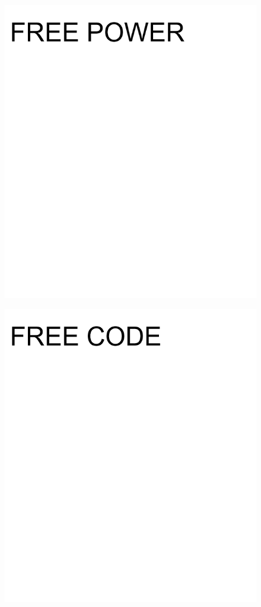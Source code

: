 \documentclass[17pt]{extreport}
\begin{document}
        \begin{figure}
		\centering
		\includegraphics[width=8.0in]{imageset/uploadimages/freepower.png}
	\end{figure}	
        \begin{figure}
		\centering
		\includegraphics[width=8.0in]{imageset/uploadimages/freecode.png}
	\end{figure}	
\end{document}
